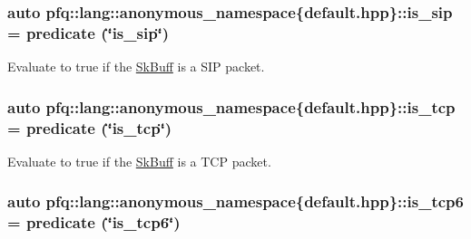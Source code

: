 \subsubsection[{\texorpdfstring{is\+\_\+sip}{is_sip}}]{\setlength{\rightskip}{0pt plus 5cm}auto pfq\+::lang\+::anonymous\+\_\+namespace\{default.\+hpp\}\+::is\+\_\+sip = {\bf predicate} (\char`\"{}is\+\_\+sip\char`\"{})}\hypertarget{namespacepfq_1_1lang_1_1anonymous__namespace_02default_8hpp_03_a8be76da99d48c27e0377a7b32e1b5d7d}{}\label{namespacepfq_1_1lang_1_1anonymous__namespace_02default_8hpp_03_a8be76da99d48c27e0377a7b32e1b5d7d}


Evaluate to {\ttfamily true} if the \hyperlink{structpfq_1_1lang_1_1SkBuff}{Sk\+Buff} is a S\+IP packet. 

\subsubsection[{\texorpdfstring{is\+\_\+tcp}{is_tcp}}]{\setlength{\rightskip}{0pt plus 5cm}auto pfq\+::lang\+::anonymous\+\_\+namespace\{default.\+hpp\}\+::is\+\_\+tcp = {\bf predicate} (\char`\"{}is\+\_\+tcp\char`\"{})}\hypertarget{namespacepfq_1_1lang_1_1anonymous__namespace_02default_8hpp_03_a67fe3072aa5353c1526aa04320d40137}{}\label{namespacepfq_1_1lang_1_1anonymous__namespace_02default_8hpp_03_a67fe3072aa5353c1526aa04320d40137}


Evaluate to {\ttfamily true} if the \hyperlink{structpfq_1_1lang_1_1SkBuff}{Sk\+Buff} is a T\+CP packet. 

\subsubsection[{\texorpdfstring{is\+\_\+tcp6}{is_tcp6}}]{\setlength{\rightskip}{0pt plus 5cm}auto pfq\+::lang\+::anonymous\+\_\+namespace\{default.\+hpp\}\+::is\+\_\+tcp6 = {\bf predicate} (\char`\"{}is\+\_\+tcp6\char`\"{})}\hypertarget{namespacepfq_1_1lang_1_1anonymous__namespace_02default_8hpp_03_a56d9bafc51ca6775da4ec3b816b1c7bb}{}\label{namespacepfq_1_1lang_1_1anonymous__namespace_02default_8hpp_03_a56d9bafc51ca6775da4ec3b816b1c7bb}


